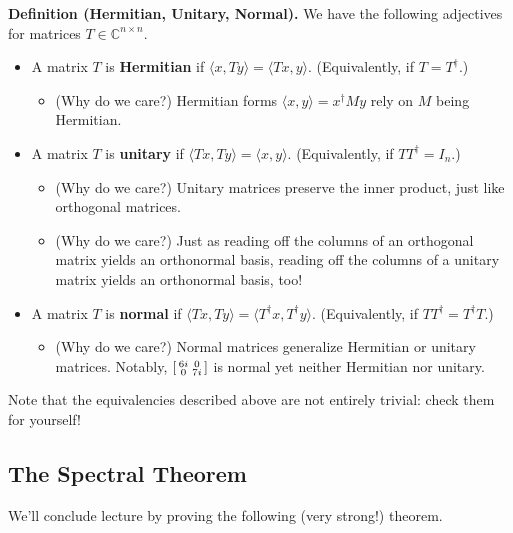 \textbf{Definition (Hermitian, Unitary, Normal).} We have the following adjectives for matrices $T \in \mathbb{C}^{n \times n}$.
\begin{itemize}
    \item A matrix $T$ is \textbf{Hermitian} if $\langle x, Ty \rangle = \langle Tx, y \rangle$. (Equivalently, if $T = T^{\dagger}$.)
    \begin{itemize}
        \item \textcolor{black!45}{(Why do we care?)} Hermitian forms $\langle x, y \rangle = x^{\dagger}My$ rely on $M$ being Hermitian.
    \end{itemize}
    \item A matrix $T$ is \textbf{unitary} if $\langle Tx, Ty \rangle = \langle x, y \rangle$.  (Equivalently, if $TT^{\dagger} = I_n$.)
    \begin{itemize}
        \item \textcolor{black!45}{(Why do we care?)} Unitary matrices preserve the inner product, just like orthogonal matrices.
        \item \textcolor{black!45}{(Why do we care?)} Just as reading off the columns of an orthogonal matrix yields an orthonormal basis, reading off the columns of a unitary matrix yields an orthonormal basis, too!
    \end{itemize}
    \item A matrix $T$ is \textbf{normal} if $\langle Tx, Ty \rangle = \langle T^{\dagger}x, T^{\dagger}y \rangle$.  (Equivalently, if $TT^{\dagger} = T^{\dagger}T$.)
    \begin{itemize}
        \item \textcolor{black!45}{(Why do we care?)} Normal matrices generalize Hermitian or unitary matrices.  Notably, $\begin{bsmallmatrix} 6i & 0 \\ 0 & 7i \end{bsmallmatrix}$ is normal yet neither Hermitian nor unitary.
    \end{itemize}
\end{itemize}
Note that the equivalencies described above are not entirely trivial: check them for yourself!

\subsection{The Spectral Theorem}

We'll conclude lecture by proving the following (very strong!) theorem.

